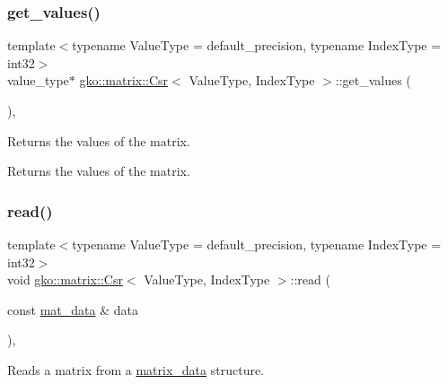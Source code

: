 \mbox{\label{classgko_1_1matrix_1_1Csr_a929b0a194e6aeb1252b8e6781d162e83}} 
\subsubsection{\texorpdfstring{get\+\_\+values()}{get\_values()}}
{\footnotesize\ttfamily template$<$typename Value\+Type = default\+\_\+precision, typename Index\+Type = int32$>$ \\
value\+\_\+type$\ast$ \hyperlink{classgko_1_1matrix_1_1Csr}{gko\+::matrix\+::\+Csr}$<$ Value\+Type, Index\+Type $>$\+::get\+\_\+values (\begin{DoxyParamCaption}{ }\end{DoxyParamCaption})\hspace{0.3cm}{\ttfamily [inline]}, {\ttfamily [noexcept]}}



Returns the values of the matrix. 

\begin{DoxyReturn}{Returns}
the values of the matrix. 
\end{DoxyReturn}
\mbox{\label{classgko_1_1matrix_1_1Csr_ac4db41146ed3c3a8653b03d6b2c6c675}} 
\subsubsection{\texorpdfstring{read()}{read()}}
{\footnotesize\ttfamily template$<$typename Value\+Type = default\+\_\+precision, typename Index\+Type = int32$>$ \\
void \hyperlink{classgko_1_1matrix_1_1Csr}{gko\+::matrix\+::\+Csr}$<$ Value\+Type, Index\+Type $>$\+::read (\begin{DoxyParamCaption}\item[{const \hyperlink{structgko_1_1matrix__data}{mat\+\_\+data} \&}]{data }\end{DoxyParamCaption})\hspace{0.3cm}{\ttfamily [override]}, {\ttfamily [virtual]}}



Reads a matrix from a \hyperlink{structgko_1_1matrix__data}{matrix\+\_\+data} structure. 


